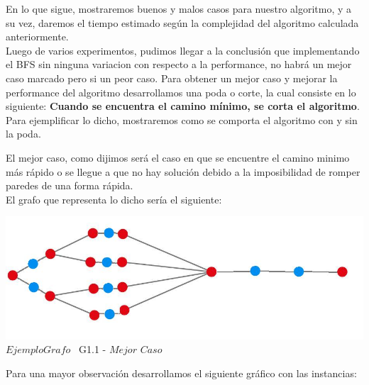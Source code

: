 \indent En lo que sigue, mostraremos buenos y malos casos para nuestro algoritmo, y a su vez, daremos el tiempo estimado 
seg\'un la complejidad del algoritmo calculada anteriormente.\\

Luego de varios experimentos, pudimos llegar a la conclusi\'on que implementando el BFS sin ninguna variacion con respecto a la performance, no habr\'a un mejor caso marcado pero si un peor caso. Para obtener un mejor caso y mejorar la performance del algoritmo desarrollamos una poda o corte, la cual consiste en lo siguiente: \textbf{Cuando se encuentra el camino m\'inimo, se corta el algoritmo}.\\

Para ejemplificar lo dicho, mostraremos como se comporta el algoritmo con y sin la poda.

El mejor caso, como dijimos ser\'a el caso en que se encuentre el camino minimo m\'as r\'apido o se llegue a que no hay soluci\'on debido a la imposibilidad de romper paredes de una forma r\'apida.\\

El grafo que representa lo dicho ser\'ia el siguiente:\\

\vspace*{0.3cm} \vspace*{0.3cm}
  \begin{center}
\includegraphics[scale=0.65]{./EJ1/ej1grafomejorcaso.jpeg}
{$Ejemplo Grafo$ \ G1.1 - $Mejor$ $Caso$}
  \end{center}
  \vspace*{0.3cm}


Para una mayor observaci\'on desarrollamos el siguiente gr\'afico con las instancias:\\

